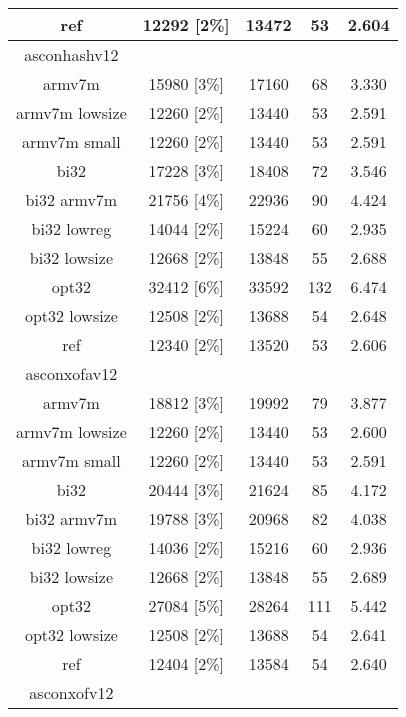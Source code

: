 \begin{table}[h]
\begin{tabular}{|c|c|c|c|c|}
        \hline
        ref & 12292 [2\%] & 13472 & 53 & 2.604 \\
        \hline
        asconhashv12 & & & & \\
        \hline
        armv7m & 15980 [3\%] & 17160 & 68 & 3.330 \\
        \hline
        armv7m lowsize & 12260 [2\%] & 13440 & 53 & 2.591 \\
        \hline
        armv7m small & 12260 [2\%] & 13440 & 53 & 2.591 \\
        \hline
        bi32 & 17228 [3\%] & 18408 & 72 & 3.546 \\
        \hline
        bi32 armv7m & 21756 [4\%] & 22936 & 90 & 4.424 \\
        \hline
        bi32 lowreg & 14044 [2\%] & 15224 & 60 & 2.935 \\
        \hline
        bi32 lowsize & 12668 [2\%] & 13848 & 55 & 2.688 \\
        \hline
        opt32 & 32412 [6\%] & 33592 & 132 & 6.474 \\
        \hline
        opt32 lowsize & 12508 [2\%] & 13688 & 54 & 2.648 \\
        \hline
        ref & 12340 [2\%] & 13520 & 53 & 2.606 \\
        \hline
        asconxofav12 & & & & \\
        \hline
        armv7m & 18812 [3\%] & 19992 & 79 & 3.877 \\
        \hline
        armv7m lowsize & 12260 [2\%] & 13440 & 53 & 2.600 \\
        \hline
        armv7m small & 12260 [2\%] & 13440 & 53 & 2.591 \\
        \hline
        bi32 & 20444 [3\%] & 21624 & 85 & 4.172 \\
        \hline
        bi32 armv7m & 19788 [3\%] & 20968 & 82 & 4.038 \\
        \hline
        bi32 lowreg & 14036 [2\%] & 15216 & 60 & 2.936 \\
        \hline
        bi32 lowsize & 12668 [2\%] & 13848 & 55 & 2.689 \\
        \hline
        opt32 & 27084 [5\%] & 28264 & 111 & 5.442 \\
        \hline
        opt32 lowsize & 12508 [2\%] & 13688 & 54 & 2.641 \\
        \hline
        ref & 12404 [2\%] & 13584 & 54 & 2.640 \\
        \hline
        asconxofv12 & & & & \\
        \hline

\end{tabular}
\end{table}
